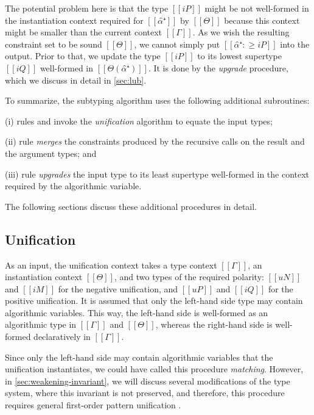 The potential problem here is that the type $[[iP]]$ might be not well-formed in
the instantiation context required for $[[α̂⁺]]$ by $[[Θ]]$ because this
context might be smaller than the current context $[[Γ]]$. As we wish the
resulting constraint set to be sound \wrt $[[Θ]]$, we cannot simply put 
$[[α̂⁺ :≥ iP]]$ into the output. Prior to that, we update the type $[[iP]]$ to its
lowest supertype $[[iQ]]$ well-formed in $[[Θ(α̂⁺)]]$. It is done by the
\emph{upgrade} procedure, which we discuss in detail in \cref{sec:lub}.

\vspace{\baselineskip}
To summarize, the subtyping algorithm uses the following additional subroutines:
\begin{enumerate*}[noitemsep]
  \item[(i)] rules  and
     invoke the \emph{unification} algorithm
    to equate the input types;
  \item[(ii)] rule  \emph{merges} the constraints
    produced by the recursive calls on the result and the argument types; and
  \item[(iii)] rule  \emph{upgrades} the input type
    to its least supertype well-formed in the context required by the
    algorithmic variable.
\end{enumerate*}
The following sections discuss these additional procedures in detail.

\subsection{Unification}
\label{sec:unification}

As an input, the unification context takes a type context $[[Γ]]$, an
instantiation context $[[Θ]]$, and two types of the required polarity: $[[uN]]$
and  $[[iM]]$ for the negative unification, and $[[uP]]$ and  $[[iQ]]$ for the
positive unification. It is assumed that only the left-hand side type may
contain algorithmic variables. This way, the left-hand side is well-formed as an
algorithmic type in $[[Γ]]$ and $[[Θ]]$, whereas the right-hand side is
well-formed declaratively in $[[Γ]]$.

Since only the left-hand side may contain algorithmic variables that the unification instantiates, we could have called this procedure \emph{matching}.
However, in \cref{sec:weakening-invariant}, we will discuss several
modifications of the type system, where this invariant is not preserved, and
therefore, this procedure requires general first-order pattern unification
\cite{miller1991:unification}.

